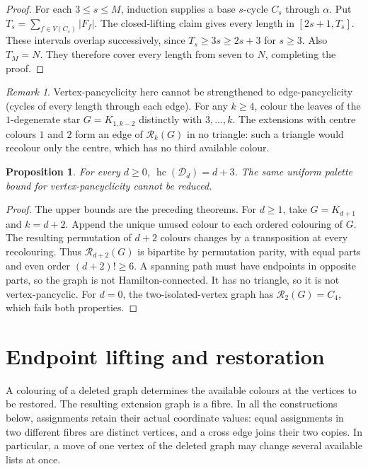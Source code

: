 \documentclass[11pt]{article}
\newtheorem{proposition}[theorem]{Proposition}
\theoremstyle{remark}
\newtheorem{remark}[theorem]{Remark}
\newcommand{\R}{\mathcal R}
\newcommand{\Rk}{\mathcal R_k}
\newcommand{\hc}{\operatorname{hc}}
\numberwithin{equation}{section}
\numberwithin{table}{section}
\begin{document}
\begin{proof}
For each $3\le s\le M$, induction supplies a base $s$-cycle $C_s$
through $\alpha$. Put $T_s=\sum_{f\in V(C_s)}|F_f|$.
The closed-lifting claim gives every length in $[2s+1,T_s]$.
These intervals overlap successively, since $T_s\ge3s\ge2s+3$
for $s\ge3$. Also $T_M=N$. They therefore cover every length
from seven to $N$, completing the proof.
\end{proof}

\begin{remark}\label{rem:not-edge-pancyclic}
Vertex-pancyclicity here cannot be strengthened to edge-pancyclicity
(cycles of every length through each edge). For any $k\ge4$, colour the
leaves of the $1$-degenerate star $G=K_{1,k-2}$ distinctly with
$3,\ldots,k$. The extensions with centre colours $1$ and $2$ form an
edge of $\Rk(G)$ in no triangle: such a triangle would recolour only
the centre, which has no third available colour.
\end{remark}


\begin{proposition}\label{prop:degenerate-sharp}
For every $d\ge0$, $\hc(\mathcal D_d)=d+3$. The same uniform palette
bound for vertex-pancyclicity cannot be reduced.
\end{proposition}
\begin{proof}
The upper bounds are the preceding theorems. For $d\ge1$, take
$G=K_{d+1}$ and $k=d+2$. Append the unique unused colour to each
ordered colouring of $G$. The resulting permutation of $d+2$ colours
changes by a transposition at every recolouring. Thus $\R_{d+2}(G)$
is bipartite by permutation parity, with equal parts and even order
$(d+2)!\ge6$. A spanning path must have endpoints in opposite parts,
so the graph is not Hamilton-connected. It has no triangle, so it is
not vertex-pancyclic. For $d=0$, the two-isolated-vertex graph has
$\R_2(G)=C_4$, which fails both properties.
\end{proof}

\section{Endpoint lifting and restoration}
\label{sec:restoration}

A colouring of a deleted graph determines the available colours at the
vertices to be restored.  The resulting extension graph is a fibre.  In
all the constructions below, assignments retain their actual coordinate
values: equal assignments in two different fibres are distinct vertices,
and a cross edge joins their two copies.  In particular, a move of one
vertex of the deleted graph may change several available lists at once.
\end{document}
